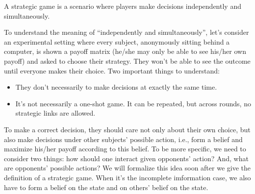A strategic game is a scenario where players make decisions independently and simultaneously. 

To understand the meaning of ``independently and simultaneously'', let's consider an experimental setting where every subject, anonymously sitting behind a computer, is shown a payoff matrix (he/she may only be able to see his/her own payoff) and asked to choose their strategy.
They won't be able to see the outcome until everyone makes their choice. Two important things to understand:
\begin{itemize}
    \item They don't necessarily to make decisions at exactly the same time.
    \item It's not necessarily a one-shot game. It can be repeated, but across rounds, no strategic links are allowed. 
\end{itemize}

To make a correct decision, they should care not only about their own choice, but also make decisions under other subjects' possible action, i.e., form a belief and maximize his/her payoff according to this belief. 
To be more specific, we need to consider two things: how should one interact given opponents' action? And, what are opponents' possible actions?
We will formalize this idea soon after we give the definition of a strategic game. When it's the incomplete imformation case, we also have to form a belief on the state and on others' belief on the state.
